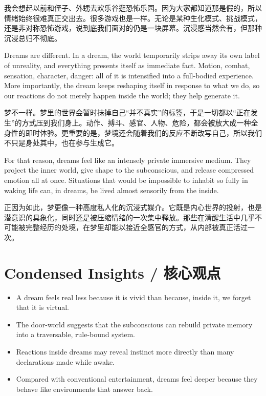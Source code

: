 \begin{translationbox}
我会想起以前和侄子、外甥去欢乐谷逛恐怖乐园。因为大家都知道那是假的，所以情绪始终很难真正交出去。很多游戏也是一样。无论是某种生化模式、挑战模式，还是非对称恐怖游戏，说到底我们面对的仍是一块屏幕。沉浸感当然会有，但那种沉浸总归不彻底。
\end{translationbox}

Dreams are different. In a dream, the world temporarily strips away its own label of unreality, and everything presents itself as immediate fact. Motion, combat, sensation, character, danger: all of it is intensified into a full-bodied experience. More importantly, the dream keeps reshaping itself in response to what we do, so our reactions do not merely happen inside the world; they help generate it.

\begin{translationbox}
梦不一样。梦里的世界会暂时抹掉自己“并不真实”的标签，于是一切都以“正在发生”的方式压到我们身上。动作、搏斗、感官、人物、危险，都会被放大成一种全身性的即时体验。更重要的是，梦境还会随着我们的反应不断改写自己，所以我们不只是身处其中，也在参与生成它。
\end{translationbox}

For that reason, dreams feel like an intensely private immersive medium. They project the inner world, give shape to the subconscious, and release compressed emotion all at once. Situations that would be impossible to inhabit so fully in waking life can, in dreams, be lived almost sensorily from the inside.

\begin{translationbox}
正因为如此，梦更像一种高度私人化的沉浸式媒介。它既是内心世界的投射，也是潜意识的具象化，同时还是被压缩情绪的一次集中释放。那些在清醒生活中几乎不可能被完整经历的处境，在梦里却能以接近全感官的方式，从内部被真正活过一次。
\end{translationbox}

\section{Condensed Insights / 核心观点}

\begin{itemize}[leftmargin=1.5em]
  \item A dream feels real less because it is vivid than because, inside it, we forget that it is virtual.
  \item The door-world suggests that the subconscious can rebuild private memory into a traversable, rule-bound system.
  \item Reactions inside dreams may reveal instinct more directly than many declarations made while awake.
  \item Compared with conventional entertainment, dreams feel deeper because they behave like environments that answer back.
\end{itemize}

